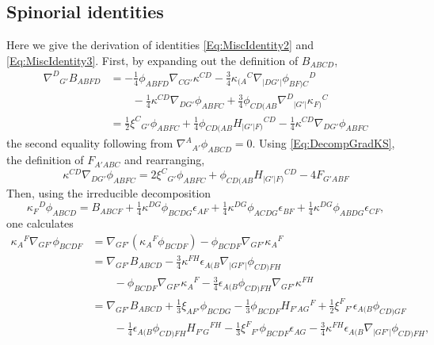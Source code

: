 \documentclass[10pt,a4paper]{article}
\theoremstyle{plain}
\begin{document}
\subsection{Spinorial identities}

Here we give the derivation of identities \eqref{Eq:MiscIdentity2} and \eqref{Eq:MiscIdentity3}. First, by expanding out the definition of $B_{ABCD}$,
\begin{align*}
\nabla^D{}_{G'}B_{ABFD} &= - \tfrac{1}{4} \phi_{ABFD} \nabla_{CG'}\kappa^{CD}  -  \tfrac{3}{4} \kappa_{(A}{}^{C} \nabla_{\vert DG'\vert}\phi_{BF)C}{}^{D} \\
&\qquad -  \tfrac{1}{4} \kappa^{CD} \nabla_{DG'}\phi_{ABFC} + \tfrac{3}{4} \phi_{CD(AB} \nabla^{D}{}_{\vert G'\vert}\kappa_{F)}{}^{C} \\
&=\tfrac{1}{2} \xi^{C}{}_{G'} \phi_{ABFC} + \tfrac{1}{4} \phi_{CD(AB} H_{\vert G'\vert F)}{}^{CD}  -  \tfrac{1}{4} \kappa^{CD} \nabla_{DG'}\phi_{ABFC}
\end{align*}
the second equality following from $\nabla^A{}_{A'}\phi_{ABCD}=0$. Using \eqref{Eq:DecompGradKS}, the definition of $F_{A'ABC}$ and rearranging, 
\begin{equation}
 \kappa^{CD} \nabla_{DG'}\phi_{ABFC} = 2 \xi^{C}{}_{G'} \phi_{ABFC} +
 \phi_{CD(AB} H_{\vert G'\vert F)}{}^{CD} - 4
 F_{G'ABF}\label{Eq:MiscIdentity}
 \end{equation}
Then, using the irreducible decomposition
\begin{equation*}
\kappa_{F}{}^{D} \phi_{ABCD} = B_{ABCF} + \tfrac{1}{4} \kappa^{DG} \phi_{BCDG} \epsilon_{AF} + \tfrac{1}{4} \kappa^{DG} \phi_{ACDG} \epsilon_{BF} + \tfrac{1}{4} \kappa^{DG} \phi_{ABDG} \epsilon_{CF},	
\end{equation*}
one calculates
\begin{align*}
	\kappa_{A}{}^{F} \nabla_{GF'}\phi_{BCDF} &= \nabla_{GF'}(\kappa_{A}{}^{F}\phi_{BCDF}) - \phi_{BCDF}\nabla_{GF'}\kappa_{A}{}^{F}\\
	&= \nabla_{GF'}B_{ABCD} -     \tfrac{3}{4} \kappa^{FH} \epsilon_{A(B} \nabla_{\vert GF'\vert}\phi_{CD)FH}\\
	&\qquad -  \phi_{BCDF} \nabla_{GF'}\kappa_{A}{}^{F} -  \tfrac{3}{4} \epsilon_{A(B}\phi_{CD)FH} \nabla_{GF'}\kappa^{FH}\\
	&=\nabla_{GF'}B_{ABCD} + \tfrac{1}{3} \xi_{AF'} \phi_{BCDG} -  \tfrac{1}{3} \phi_{BCDF} H_{F'AG}{}^{F} + \tfrac{1}{2} \xi^{F}{}_{F'}\epsilon_{A(B} \phi_{CD)GF}  \\
	&\qquad -  \tfrac{1}{4} \epsilon_{A(B}\phi_{CD)FH} H_{F'G}{}^{FH}   -  \tfrac{1}{3} \xi^{F}{}_{F'} \phi_{BCDF} \epsilon_{AG}  -  \tfrac{3}{4} \kappa^{FH} \epsilon_{A(B} \nabla_{\vert GF'\vert}\phi_{CD)FH},
\end{align*}
\end{document}
